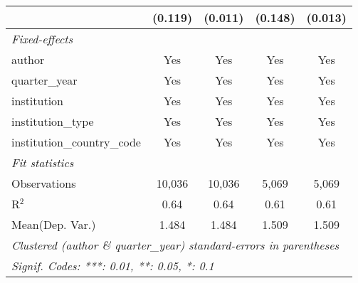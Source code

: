 \begin{tabular}{lcccc}
                                            & (0.119) & (0.011)     & (0.148) & (0.013)\\   
   \midrule
   \emph{Fixed-effects}\\
   author                                   & Yes     & Yes         & Yes     & Yes\\  
   quarter\_year                            & Yes     & Yes         & Yes     & Yes\\  
   institution                              & Yes     & Yes         & Yes     & Yes\\  
   institution\_type                        & Yes     & Yes         & Yes     & Yes\\  
   institution\_country\_code               & Yes     & Yes         & Yes     & Yes\\  
   \midrule
   \emph{Fit statistics}\\
   Observations                             & 10,036  & 10,036      & 5,069   & 5,069\\  
   R$^2$                                    & 0.64    & 0.64        & 0.61    & 0.61\\  
Mean(Dep. Var.) & 1.484 & 1.484 & 1.509 & 1.509 \\
   \midrule \midrule
   \multicolumn{5}{l}{\emph{Clustered (author \& quarter\_year) standard-errors in parentheses}}\\
   \multicolumn{5}{l}{\emph{Signif. Codes: ***: 0.01, **: 0.05, *: 0.1}}\\
\end{tabular}
\par\endgroup
